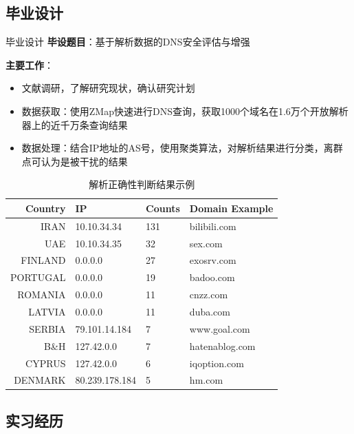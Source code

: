 \documentclass{beamer}
\begin{document}
\subsection{毕业设计}
\begin{frame}{毕业设计}
  \textbf{毕设题目}：基于解析数据的DNS安全评估与增强

  \textbf{主要工作}：
  \begin{itemize}
    \item 文献调研，了解研究现状，确认研究计划
    \item 数据获取：使用ZMap快速进行DNS查询，获取1000个域名在1.6万个开放解析器上的近千万条查询结果
    \item 数据处理：结合IP地址的AS号，使用聚类算法，对解析结果进行分类，离群点可认为是被干扰的结果
  \end{itemize}

  \begin{table}
    \tiny
    \begin{tabular}{r l l l}
      \toprule
      Country &IP & Counts & Domain Example\\
      \midrule
           
      IRAN &	10.10.34.34&131&bilibili.com\\
      UAE &	10.10.34.35&32&sex.com\\
      FINLAND &	0.0.0.0 & 27 &exosrv.com\\
      PORTUGAL &	0.0.0.0&19&badoo.com\\
      ROMANIA &	0.0.0.0&11&cnzz.com\\
      LATVIA &	0.0.0.0&11&duba.com\\
      SERBIA &	79.101.14.184&7&www.goal.com\\
      B\&H &	127.42.0.0& 7&hatenablog.com\\
      CYPRUS &	127.42.0.0&6&iqoption.com\\
      DENMARK &	80.239.178.184&5&hm.com\\
      \bottomrule
      \end{tabular}
      \caption{解析正确性判断结果示例}
  \end{table}
\end{frame}

\subsection{实习经历}
\end{document}
